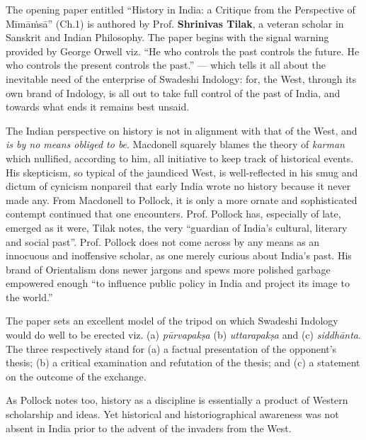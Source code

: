 The opening paper entitled “History in India: a Critique from the Perspective of Mīmāṁsā” (Ch.1) is authored by Prof. \textbf{Shrinivas Tilak}, a veteran scholar in Sanskrit and Indian Philosophy. The paper begins with the signal warning provided by George Orwell viz. “He who controls the past controls the future. He who controls the present controls the past.” — which tells it all about the inevitable need of the enterprise of Swadeshi Indology: for, the West, through its own brand of Indology, is all out to take full control of the past of India, and towards what ends it remains best unsaid. 

The Indian perspective on history is not in alignment with that of the West, and \textit{is by no means obliged to be}. Macdonell squarely blames the theory of \textit{karman} which nullified, according to him, all initiative to keep track of historical events. His skepticism, so typical of the jaundiced West, is well-reflected in his smug and dictum of cynicism nonpareil that early India wrote no history because it never made any. From Macdonell to Pollock, it is only a more ornate and sophisticated contempt continued that one encounters. Prof. Pollock has, especially of late, emerged as it were, Tilak notes, the very ``guardian of India’s cultural, literary and social past”. Prof. Pollock does not come across by any means as an innocuous and inoffensive scholar, as one merely curious about India’s past. His brand of Orientalism dons newer jargons and spews more polished garbage empowered enough “to influence public policy in India and project its image to the world.”

The paper sets an excellent model of the tripod on which Swadeshi Indology would do well to be erected viz. (a) \textit{pūrvapakṣa} (b) \textit{uttarapakṣa} and (c) \textit{siddhānta}. The three respectively stand for (a) a factual presentation of the opponent’s thesis; (b) a critical examination and refutation of the thesis; and (c) a statement on the outcome of the exchange. 

As Pollock notes too, history as a discipline is essentially a product of Western scholarship and ideas. Yet historical and historiographical awareness was not absent in India prior to the advent of the invaders from the West.

\newpage

